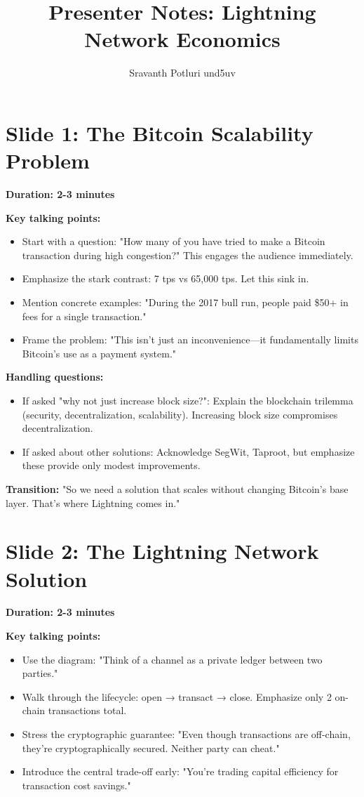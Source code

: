 \documentclass[11pt]{article}
\title{Presenter Notes: Lightning Network Economics}
\author{Sravanth Potluri und5uv}
\date{}
\begin{document}
\maketitle

\section*{Slide 1: The Bitcoin Scalability Problem}

\textbf{Duration: 2-3 minutes}

\textbf{Key talking points:}
\begin{itemize}
    \item Start with a question: "How many of you have tried to make a Bitcoin transaction during high congestion?" This engages the audience immediately.
    \item Emphasize the stark contrast: 7 tps vs 65,000 tps. Let this sink in.
    \item Mention concrete examples: "During the 2017 bull run, people paid \$50+ in fees for a single transaction."
    \item Frame the problem: "This isn't just an inconvenience—it fundamentally limits Bitcoin's use as a payment system."
\end{itemize}

\textbf{Handling questions:}
\begin{itemize}
    \item If asked "why not just increase block size?": Explain the blockchain trilemma (security, decentralization, scalability). Increasing block size compromises decentralization.
    \item If asked about other solutions: Acknowledge SegWit, Taproot, but emphasize these provide only modest improvements.
\end{itemize}

\textbf{Transition:} "So we need a solution that scales without changing Bitcoin's base layer. That's where Lightning comes in."

\section*{Slide 2: The Lightning Network Solution}

\textbf{Duration: 2-3 minutes}

\textbf{Key talking points:}
\begin{itemize}
    \item Use the diagram: "Think of a channel as a private ledger between two parties."
    \item Walk through the lifecycle: open → transact → close. Emphasize only 2 on-chain transactions total.
    \item Stress the cryptographic guarantee: "Even though transactions are off-chain, they're cryptographically secured. Neither party can cheat."
    \item Introduce the central trade-off early: "You're trading capital efficiency for transaction cost savings."
\end{itemize}
\end{document}
